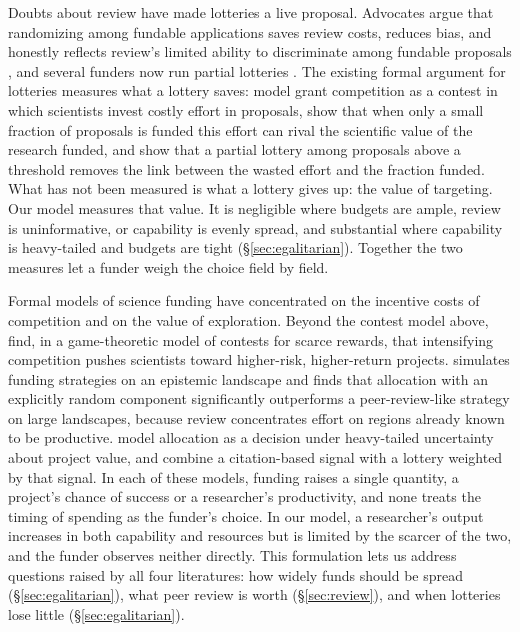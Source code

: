 \documentclass[article, 11pt, reqno]{amsart}
\theoremstyle{named}
\begin{document}
Doubts about review have made lotteries a live proposal. Advocates argue that randomizing among fundable applications saves review costs, reduces bias, and honestly reflects review's limited ability to discriminate among fundable proposals \citep{FangCasadevall2016, Avin2019, Roumbanis2019}, and several funders now run partial lotteries \citep{Liu2020, Heyard2022, Luebber2025}. The existing formal argument for lotteries measures what a lottery saves: \citet{GrossBergstrom2019} model grant competition as a contest in which scientists invest costly effort in proposals, show that when only a small fraction of proposals is funded this effort can rival the scientific value of the research funded, and show that a partial lottery among proposals above a threshold removes the link between the wasted effort and the fraction funded. What has not been measured is what a lottery gives up: the value of targeting. Our model measures that value. It is negligible where budgets are ample, review is uninformative, or capability is evenly spread, and substantial where capability is heavy-tailed and budgets are tight (\S\ref{sec:egalitarian}). Together the two measures let a funder weigh the choice field by field.

Formal models of science funding have concentrated on the incentive costs of competition and on the value of exploration. Beyond the contest model above, \citet{GrossBergstrom2025} find, in a game-theoretic model of contests for scarce rewards, that intensifying competition pushes scientists toward higher-risk, higher-return projects. \citet{AvinBJPS2019} simulates funding strategies on an epistemic landscape and finds that allocation with an explicitly random component significantly outperforms a peer-review-like strategy on large landscapes, because review concentrates effort on regions already known to be productive. \citet{Sorzano2026} model allocation as a decision under heavy-tailed uncertainty about project value, and combine a citation-based signal with a lottery weighted by that signal. In each of these models, funding raises a single quantity, a project's chance of success or a researcher's productivity, and none treats the timing of spending as the funder's choice. In our model, a researcher's output increases in both capability and resources but is limited by the scarcer of the two, and the funder observes neither directly. This formulation lets us address questions raised by all four literatures: how widely funds should be spread (\S\ref{sec:egalitarian}), what peer review is worth (\S\ref{sec:review}), and when lotteries lose little (\S\ref{sec:egalitarian}).
\end{document}
